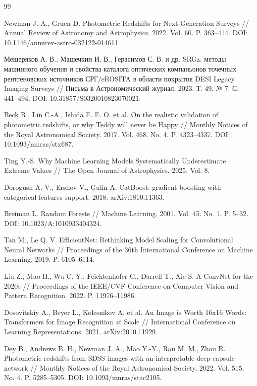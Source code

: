 \documentclass[12pt,a4paper]{article}
\begin{document}
\newpage
\begin{thebibliography}{99}

Newman J. A., Gruen D. Photometric Redshifts for Next-Generation Surveys // Annual Review of Astronomy and Astrophysics. 2022. Vol. 60. P. 363–414. DOI: 10.1146/annurev-astro-032122-014611.

Мещеряков А. В., Машечкин И. В., Герасимов С. В. и др. SRGz: методы машинного обучения и свойства каталога оптических компаньонов точечных рентгеновских источников СРГ/eROSITA в области покрытия DESI Legacy Imaging Surveys // Письма в Астрономический журнал. 2023. Т. 49. № 7. С. 441–494. DOI: 10.31857/S0320010823070021.

Beck R., Lin C.-A., Ishida E. E. O. et al. On the realistic validation of photometric redshifts, or why Teddy will never be Happy // Monthly Notices of the Royal Astronomical Society. 2017. Vol. 468. No. 4. P. 4323–4337. DOI: 10.1093/mnras/stx687.

Ting Y.-S. Why Machine Learning Models Systematically Underestimate Extreme Values // The Open Journal of Astrophysics. 2025. Vol. 8.

Dorogush A. V., Ershov V., Gulin A. CatBoost: gradient boosting with categorical features support. 2018. arXiv:1810.11363.

Breiman L. Random Forests // Machine Learning. 2001. Vol. 45. No. 1. P. 5–32. DOI: 10.1023/A:1010933404324.

Tan M., Le Q. V. EfficientNet: Rethinking Model Scaling for Convolutional Neural Networks // Proceedings of the 36th International Conference on Machine Learning. 2019. P. 6105–6114.

Liu Z., Mao H., Wu C.-Y., Feichtenhofer C., Darrell T., Xie S. A ConvNet for the 2020s // Proceedings of the IEEE/CVF Conference on Computer Vision and Pattern Recognition. 2022. P. 11976–11986.

Dosovitskiy A., Beyer L., Kolesnikov A. et al. An Image is Worth 16x16 Words: Transformers for Image Recognition at Scale // International Conference on Learning Representations. 2021. arXiv:2010.11929.

Dey B., Andrews B. H., Newman J. A., Mao Y.-Y., Rau M. M., Zhou R. Photometric redshifts from SDSS images with an interpretable deep capsule network // Monthly Notices of the Royal Astronomical Society. 2022. Vol. 515. No. 4. P. 5285–5305. DOI: 10.1093/mnras/stac2105.


\end{thebibliography}
\end{document}
